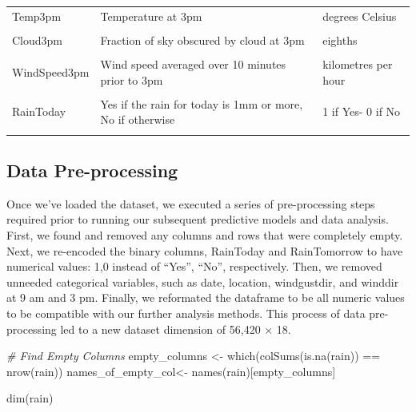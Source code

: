 \documentclass[
]{article}
\newenvironment{Shaded}{\begin{snugshade}}{\end{snugshade}}
\newcommand{\CommentTok}[1]{\textcolor[rgb]{0.56,0.35,0.01}{\textit{#1}}}
\newcommand{\FunctionTok}[1]{\textcolor[rgb]{0.00,0.00,0.00}{#1}}
\newcommand{\NormalTok}[1]{#1}
\newcommand{\OtherTok}[1]{\textcolor[rgb]{0.56,0.35,0.01}{#1}}
\newcommand{\SpecialCharTok}[1]{\textcolor[rgb]{0.00,0.00,0.00}{#1}}
\begin{document}
\begin{longtable}[l]{lll}
Temp3pm & Temperature at 3pm & degrees Celsius\\
\cellcolor{gray!15}{Humidity3pm} & \cellcolor{gray!15}{Relative humidity at 3pm} & \cellcolor{gray!15}{percent}\\
Cloud3pm & Fraction of sky obscured by cloud at 3pm & eighths\\
\cellcolor{gray!15}{WindDir3pm} & \cellcolor{gray!15}{Wind direction averaged over 10 minutes prior to 3pm} & \cellcolor{gray!15}{16 compass points}\\
WindSpeed3pm & Wind speed averaged over 10 minutes prior to 3pm & kilometres per hour\\
\cellcolor{gray!15}{Pressure3pm} & \cellcolor{gray!15}{Atmospheric pressure reduced to mean sea level at 3pm} & \cellcolor{gray!15}{hectopascals}\\
RainToday & Yes if the rain for today is 1mm or more, No if otherwise & 1 if Yes- 0 if No\\
\cellcolor{gray!15}{RainTomorrow} & \cellcolor{gray!15}{Yes if the rain for tomorrow is >= 1mm} & \cellcolor{gray!15}{1 if Yes- 0 if No}\\*
\end{longtable}

\hypertarget{data-pre-processing}{%
\subsection{Data Pre-processing}\label{data-pre-processing}}

Once we've loaded the dataset, we executed a series of pre-processing
steps required prior to running our subsequent predictive models and
data analysis. First, we found and removed any columns and rows that
were completely empty. Next, we re-encoded the binary columns, RainToday
and RainTomorrow to have numerical values: 1,0 instead of ``Yes'',
``No'', respectively. Then, we removed unneeded categorical variables,
such as date, location, windgustdir, and winddir at 9 am and 3 pm.
Finally, we reformated the dataframe to be all numeric values to be
compatible with our further analysis methods. This process of data
pre-processing led to a new dataset dimension of 56,420 × 18.

\begin{Shaded}
\begin{Highlighting}[]
\CommentTok{\# Find Empty Columns}
\NormalTok{empty\_columns }\OtherTok{\textless{}{-}} \FunctionTok{which}\NormalTok{(}\FunctionTok{colSums}\NormalTok{(}\FunctionTok{is.na}\NormalTok{(rain)) }\SpecialCharTok{==} \FunctionTok{nrow}\NormalTok{(rain))}
\NormalTok{names\_of\_empty\_col}\OtherTok{\textless{}{-}} \FunctionTok{names}\NormalTok{(rain)[empty\_columns]}

\FunctionTok{dim}\NormalTok{(rain)}
\end{Highlighting}
\end{Shaded}
\end{document}
